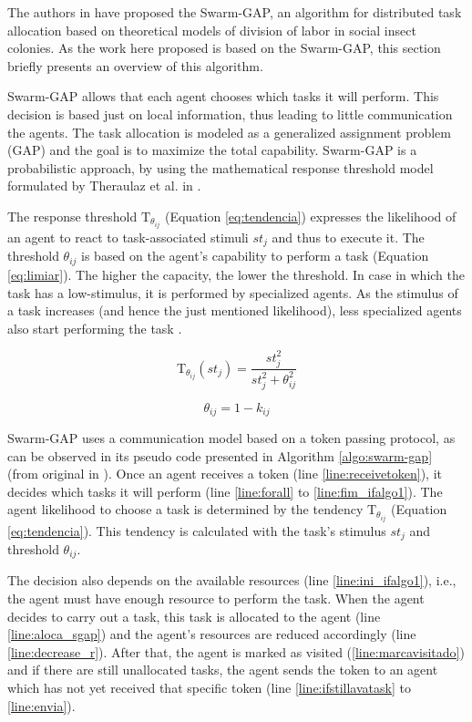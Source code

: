 The authors in \cite{ferreira2007swarm} have proposed the Swarm-GAP, an algorithm for distributed task allocation based on theoretical models of division of labor in social insect colonies. As the work here proposed is based on the Swarm-GAP, this section briefly presents an overview of this algorithm.

Swarm-GAP allows that each agent chooses which tasks it will perform. This decision is based just on local information, thus leading to little communication the agents. The task allocation is modeled as a generalized assignment problem (GAP) and the goal is to maximize the total capability.
Swarm-GAP is a probabilistic approach, by using the mathematical response threshold model formulated by Theraulaz et al. in \cite{theraulaz1998response}.

The response threshold $\textrm{T}_{\theta_{ij}}$ (Equation \ref{eq:tendencia}) expresses the likelihood of an agent to react to task-associated stimuli $st_{j}$ and thus to execute it. The threshold $\theta_{ij}$ is based on the agent's capability to perform a task (Equation \ref{eq:limiar}). The higher the capacity, the lower the threshold. 
In case in which the task has a low-stimulus, it is performed by specialized agents. As the stimulus of a task increases (and hence the just mentioned likelihood), less specialized agents also start performing the task \cite{bonabeau1999swarm}.

\begin{equation} \label{eq:tendencia}
	\textrm{T}_{\theta_{ij}}(st_j) = \frac{st_{j}^2}{st_{j}^2 + \theta_{ij}^2}
\end{equation}

\begin{equation} \label{eq:limiar}
	\theta_{ij} = 1 - k_{ij}
\end{equation}

Swarm-GAP uses a communication model based on a token passing protocol, as can be observed in its pseudo code presented in Algorithm \ref{algo:swarm-gap} (from original in \cite{MAS07}). Once an agent receives a token (line \ref{line:receivetoken}), it decides which tasks it will perform (line \ref{line:forall} to \ref{line:fim_ifalgo1}). The agent likelihood to choose a task is determined by the tendency $\textrm{T}_{\theta_{ij}}$ (Equation \ref{eq:tendencia}). 
This tendency is calculated with the task's stimulus $st_{j}$ and threshold $\theta_{ij}$.

The decision also depends on the available resources (line \ref{line:ini_ifalgo1}), i.e., the agent must have enough resource to perform the task. 
When the agent decides to carry out a task, this task is allocated to the agent (line \ref{line:aloca_sgap}) and the agent's resources are reduced accordingly (line \ref{line:decrease_r}). After that, the agent is marked as visited (\ref{line:marcavisitado}) and if there are still unallocated tasks, the agent sends the token to an agent which has not yet received that specific token (line \ref{line:ifstillavatask} to \ref{line:envia}).

